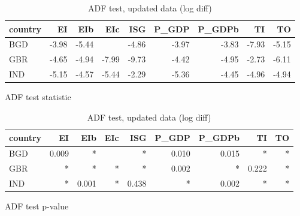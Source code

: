\documentclass[11pt,a4paper]{article}
\begin{document}
\begin{table}[htbp]
\begin{subfigure}{\textwidth}
\centering
\begin{tabular}{lrrrrrrrr}
\toprule
country &    EI &   EIb &   EIc &   ISG &  P\_GDP &  P\_GDPb &    TI &    TO \\
\midrule
    BGD & -3.98 & -5.44 &       & -4.86 &  -3.97 &   -3.83 & -7.93 & -5.15 \\
    GBR & -4.65 & -4.94 & -7.99 & -9.73 &  -4.42 &   -4.95 & -2.73 & -6.11 \\
    IND & -5.15 & -4.57 & -5.44 & -2.29 &  -5.36 &   -4.45 & -4.96 & -4.94 \\
\bottomrule
\end{tabular}
\caption{ADF test statistic}
\end{subfigure}
\begin{subfigure}{\textwidth}
\centering
\begin{tabular}{lrrrrrrrr}
\toprule
country &    EI &   EIb &  EIc &   ISG &  P\_GDP &  P\_GDPb &    TI &  TO \\
\midrule
    BGD & 0.009 &     * &      &     * &  0.010 &   0.015 &     * &   * \\
    GBR &     * &     * &    * &     * &  0.002 &       * & 0.222 &   * \\
    IND &     * & 0.001 &    * & 0.438 &      * &   0.002 &     * &   * \\
\bottomrule
\end{tabular}
\caption[ADF test p-value]{ADF test p-value\footnotemark[\value{footnote}]}
\end{subfigure}
\caption{ADF test, updated data (log diff)}
\label{tab:adf_logdiff}
\end{table}

\end{document}
